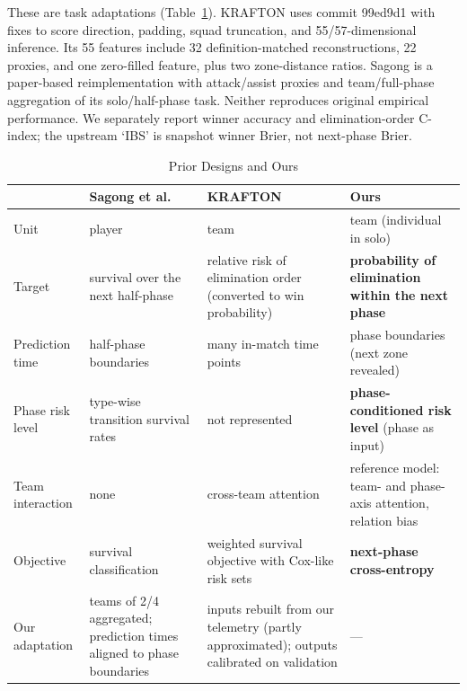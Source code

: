 \documentclass[sigconf,anonymous,nonacm]{acmart}
\begin{document}
These are task adaptations (Table~\ref{tab:compare}). KRAFTON uses commit 99ed9d1 with fixes to score direction, padding, squad truncation, and 55/57-dimensional inference. Its 55 features include 32 definition-matched reconstructions, 22 proxies, and one zero-filled feature, plus two zone-distance ratios. Sagong is a paper-based reimplementation with attack/assist proxies and team/full-phase aggregation of its solo/half-phase task. Neither reproduces original empirical performance. We separately report winner accuracy and elimination-order C-index; the upstream `IBS' is snapshot winner Brier, not next-phase Brier.

\begin{table}[t]
\centering
\caption{Prior Designs and Ours}
\label{tab:compare}
\footnotesize
\begin{tabular}{p{}p{}p{}p{}}
\hline
 & Sagong et al.~\cite{Sagong25a} & KRAFTON~\cite{KRAFTON} & Ours \\
\hline
Unit & player & team & team (individual in solo) \\
Target & survival over the next half-phase & relative risk of elimination order (converted to win probability) & \textbf{probability of elimination within the next phase} \\
Prediction time & half-phase boundaries & many in-match time points & phase boundaries (next zone revealed) \\
Phase risk level & type-wise transition survival rates & not represented & \textbf{phase-conditioned risk level} (phase as input) \\
Team interaction & none & cross-team attention & reference model: team- and phase-axis attention, relation bias \\
Objective & survival classification & weighted survival objective with Cox-like risk sets & \textbf{next-phase cross-entropy} \\
\hline
Our adaptation & teams of 2/4 aggregated; prediction times aligned to phase boundaries & inputs rebuilt from our telemetry (partly approximated); outputs calibrated on validation & --- \\
\hline
\end{tabular}
\end{table}
\end{document}
